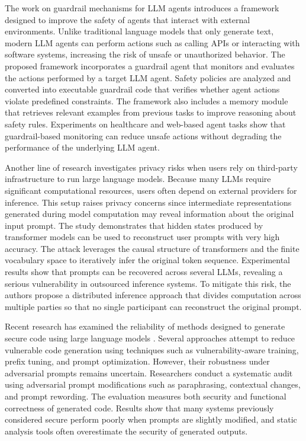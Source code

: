 \documentclass[12pt]{article}
\begin{document}
The work on guardrail mechanisms for LLM agents \cite{guardagent} introduces a framework designed to improve the safety of agents that interact with external environments. Unlike traditional language models that only generate text, modern LLM agents can perform actions such as calling APIs or interacting with software systems, increasing the risk of unsafe or unauthorized behavior. The proposed framework incorporates a guardrail agent that monitors and evaluates the actions performed by a target LLM agent. Safety policies are analyzed and converted into executable guardrail code that verifies whether agent actions violate predefined constraints. The framework also includes a memory module that retrieves relevant examples from previous tasks to improve reasoning about safety rules. Experiments on healthcare and web-based agent tasks show that guardrail-based monitoring can reduce unsafe actions without degrading the performance of the underlying LLM agent.

Another line of research \cite{hiddennomore} investigates privacy risks when users rely on third-party infrastructure to run large language models. Because many LLMs require significant computational resources, users often depend on external providers for inference. This setup raises privacy concerns since intermediate representations generated during model computation may reveal information about the original input prompt. The study demonstrates that hidden states produced by transformer models can be used to reconstruct user prompts with very high accuracy. The attack leverages the causal structure of transformers and the finite vocabulary space to iteratively infer the original token sequence. Experimental results show that prompts can be recovered across several LLMs, revealing a serious vulnerability in outsourced inference systems. To mitigate this risk, the authors propose a distributed inference approach that divides computation across multiple parties so that no single participant can reconstruct the original prompt.

Recent research has examined the reliability of methods designed to generate secure code using large language models \cite{securecode}. Several approaches attempt to reduce vulnerable code generation using techniques such as vulnerability-aware training, prefix tuning, and prompt optimization. However, their robustness under adversarial prompts remains uncertain. Researchers conduct a systematic audit using adversarial prompt modifications such as paraphrasing, contextual changes, and prompt rewording. The evaluation measures both security and functional correctness of generated code. Results show that many systems previously considered secure perform poorly when prompts are slightly modified, and static analysis tools often overestimate the security of generated outputs.
\end{document}

